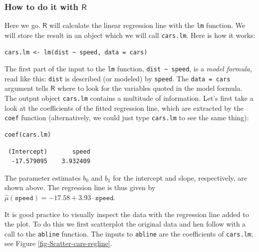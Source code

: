 \documentclass[captions=tableheading]{scrbook}
\begin{document}
\subsubsection{How to do it with \(\mathsf{R}\)}
\label{sec-11-2-1-1}




Here we go. \(\mathsf{R}\) will calculate the linear regression line with the \texttt{lm} function. We will store the result in an object which we will call \texttt{cars.lm}. Here is how it works:


\lstset{language=R}
\begin{lstlisting}
cars.lm <- lm(dist ~ speed, data = cars)
\end{lstlisting}

The first part of the input to the \texttt{lm} function, \texttt{dist \textasciitilde{} speed}, is a \emph{model formula}, read like this: \texttt{dist} is described (or modeled) by \texttt{speed}. The \texttt{data = cars} argument tells \(\mathsf{R}\) where to look for the variables quoted in the model formula. The output object \texttt{cars.lm} contains a multitude of information. Let's first take a look at the coefficients of the fitted regression line, which are extracted by the \texttt{coef} function (alternatively, we could just type \texttt{cars.lm} to see the same thing):


\lstset{language=R}
\begin{lstlisting}
coef(cars.lm)
\end{lstlisting}

\begin{verbatim}
 (Intercept)       speed 
  -17.579095    3.932409
\end{verbatim}

The parameter estimates \( b_{0} \) and \( b_{1} \) for the intercept and slope, respectively, are shown above. The regression line is thus given by \( \hat{\mu}(\mathtt{speed}) =  -17.58 +  3.93 \cdot \mathtt{speed} \).

It is good practice to visually inspect the data with the regression line added to the plot. To do this we first scatterplot the original data and hen follow with a call to the \texttt{abline} function. The inputs to \texttt{abline} are the coefficients of \texttt{cars.lm}; see Figure \ref{fig-Scatter-cars-regline}.
\end{document}
